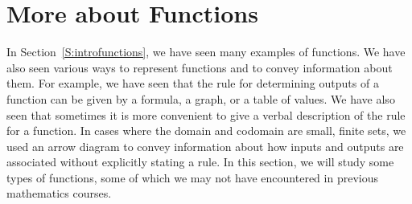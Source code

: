 \section{More about Functions} \label{S:moreaboutfunctions}
\setcounter{previewactivity}{0}
%
%
%
In Section~\ref{S:introfunctions}, we have seen many examples of functions.  We have also seen various ways to represent functions and to convey information about them.  For example, we have seen that the rule for determining outputs of a function can be given by a formula, a graph, or a table of values.  We have also seen that sometimes it is more convenient to give a verbal description of the rule for a function.  In cases where the domain and codomain are small, finite sets, we used an arrow diagram to convey information about how inputs and outputs are associated without explicitly stating a rule.  In this section, we will study some types of functions, some of which we may not have encountered in previous mathematics courses.



%





\endinput



